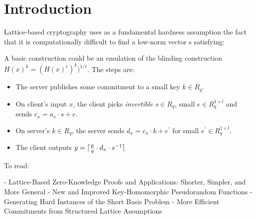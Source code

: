 \section{Introduction}%
\label{sec:introduction}

Lattice-based cryptography uses as a fundamental hardness assumption the fact that it is computationally difficult to find a low-norm vector s satisfying:

A basic construction could be an emulation of the blinding construction $H(x)^{k} = (H(x) ^{r})^{k}) ^ {1/r}$.
The steps are:

\begin{itemize}
  \item The server publishes some commitment to a small key $k \in R_q$.
  \item On client's input $x$, the client picks \emph{invertible} $s \in R_q$, small $e \in R^{1 \times l}_q$ and sends $c_x = a_x \cdot s + e$.
  \item On server's $k \in R_q$, the server sends $d_x = c_x \cdot k + e^{\prime}$ for small $e^{\prime} \in R^{1 \times l}_q$.
  \item The client outputs $y = \lceil {p \over q} \cdot d_x \cdot s^{-1} \rceil$
\end{itemize}

To read:

- Lattice-Based Zero-Knowledge Proofs and Applications: Shorter, Simpler, and More General
- New and Improved Key-Homomorphic Pseudorandom Functions
- Generating Hard Instances of the Short Basis Problem
- More Efficient Commitments from Structured Lattice Assumptions

